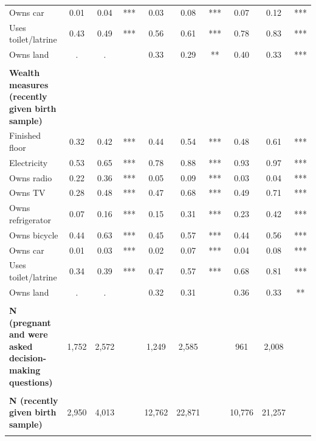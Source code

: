 \begin{tabular}{lccccccccc}
\hspace*{2em}Owns car&0.01&0.04&***&0.03&0.08&***&0.07&0.12&***\\
\hspace*{2em}Uses toilet/latrine&0.43&0.49&***&0.56&0.61&***&0.78&0.83&***\\
\hspace*{2em}Owns land&.&.&&0.33&0.29&**&0.40&0.33&***\\
&&&&&&&&&\\
\textbf{Wealth measures (recently given birth sample)}&&&&&&&&&\\
\hspace*{2em}Finished floor&0.32&0.42&***&0.44&0.54&***&0.48&0.61&***\\
\hspace*{2em}Electricity&0.53&0.65&***&0.78&0.88&***&0.93&0.97&***\\
\hspace*{2em}Owns radio&0.22&0.36&***&0.05&0.09&***&0.03&0.04&***\\
\hspace*{2em}Owns TV&0.28&0.48&***&0.47&0.68&***&0.49&0.71&***\\
\hspace*{2em}Owns refrigerator&0.07&0.16&***&0.15&0.31&***&0.23&0.42&***\\
\hspace*{2em}Owns bicycle&0.44&0.63&***&0.45&0.57&***&0.44&0.56&***\\
\hspace*{2em}Owns car&0.01&0.03&***&0.02&0.07&***&0.04&0.08&***\\
\hspace*{2em}Uses toilet/latrine&0.34&0.39&***&0.47&0.57&***&0.68&0.81&***\\
\hspace*{2em}Owns land&.&.&&0.32&0.31&&0.36&0.33&**\\
&&&&&&&&&\\
\textbf{N (pregnant and were asked decision-making questions)}&1,752&2,572&&1,249&2,585&&961&2,008&\\
&&&&&&&&&\\
\textbf{N (recently given birth sample)}&2,950&4,013&&12,762&22,871&&10,776&21,257&\\
&&&&&&&&&\\
\bottomrule
\end{tabular}
